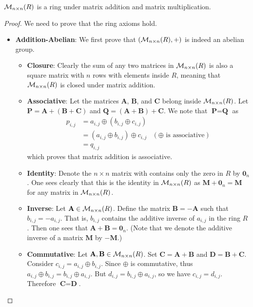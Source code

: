 \begin{proposition}
    $\mathcal{M}_{n\times n}(R)$ is a ring under matrix addition and matrix multiplication.
\end{proposition}
\begin{proof}
    We need to prove that the ring axioms hold.
    \begin{itemize}
        \item \textbf{Addition-Abelian}: We first prove that $(\mathcal{M}_{n\times n}(R), +)$ is indeed an abelian group.
        \begin{itemize}
            \item \textbf{Closure}: Clearly the sum of any two matrices in $\mathcal{M}_{n\times n}(R)$ is also a square matrix with $n$ rows with elements inside $R$, meaning that $\mathcal{M}_{n\times n}(R)$ is closed under matrix addition.

            \item \textbf{Associative}: Let the matrices $\textbf{A}$, $\textbf{B}$, and $\textbf{C}$ belong inside $\mathcal{M}_{n\times n}(R)$. Let $\textbf{P} = \textbf{A} + (\textbf{B} + \textbf{C})$ and $\textbf{Q} = (\textbf{A} + \textbf{B}) + \textbf{C}$. We note that $\textbf{P} = \textbf{Q}$ as
            \begin{align*}
                p_{i,j} &= a_{i,j} \oplus (b_{i,j} \oplus c_{i,j})\\
                &= (a_{i,j} \oplus b_{i,j}) \oplus c_{i,j} & (\oplus\text{ is associative})\\
                &= q_{i,j}
            \end{align*}
            which proves that matrix addition is associative.
    
            \item \textbf{Identity}: Denote the $n \times n$ matrix with contains only the zero in $R$ by $\textbf{0}_n$. One sees clearly that this is the identity in $\mathcal{M}_{n\times n}(R)$ as $\textbf{M} + \textbf{0}_n = \textbf{M}$ for any matrix in $\mathcal{M}_{n\times n}(R)$.
            
            \item \textbf{Inverse}: Let $\textbf{A} \in \mathcal{M}_{n\times n}(R)$. Define the matrix $\textbf{B} = -\textbf{A}$ such that $b_{i,j} = -a_{i,j}$. That is, $b_{i,j}$ contains the additive inverse of $a_{i,j}$ in the ring $R$. Then one sees that $\textbf{A} + \textbf{B} = \textbf{0}_n$.\newline
            (Note that we denote the additive inverse of a matrix $\textbf{M}$ by $-\textbf{M}$.)

            \item \textbf{Commutative}: Let $\textbf{A}, \textbf{B} \in \mathcal{M}_{n\times n}(R)$. Set $\textbf{C} = \textbf{A} + \textbf{B}$ and $\textbf{D} = \textbf{B} + \textbf{C}$. Consider $c_{i,j} = a_{i,j} \oplus b_{i,j}$. Since $\oplus$ is commutative, thus $a_{i,j} \oplus b_{i,j} = b_{i,j} \oplus a_{i,j}$. But $d_{i,j} = b_{i,j} \oplus a_{i,j}$, so we have $c_{i,j} = d_{i,j}$. Therefore $\textbf{C} = \textbf{D}$.
        \end{itemize}


\end{itemize}
\end{proof}
